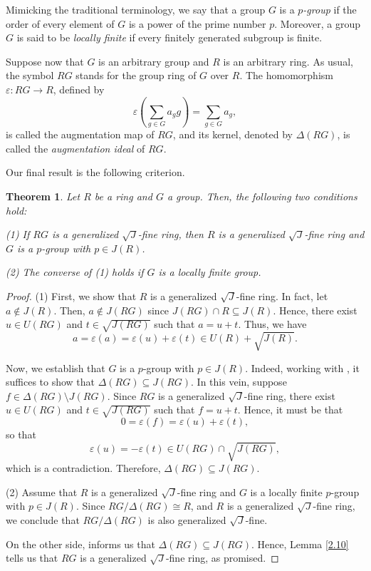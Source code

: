 \documentclass[12pt]{amsart}
\newtheorem{theorem}{Theorem}[section]
\theoremstyle{definition}
\begin{document}
Mimicking the traditional terminology, we say that a group \( G \) is a \textit{\( p \)-group} if the order of every element of \( G \) is a power of the prime number \( p \). Moreover, a group \( G \) is said to be \textit{locally finite} if every finitely generated subgroup is finite.

Suppose now that \( G \) is an arbitrary group and \( R \) is an arbitrary ring. As usual, the symbol \( RG \) stands for the group ring of \( G \) over \( R \). The homomorphism \( \varepsilon : RG \to R \), defined by
\[\varepsilon \left( \sum_{g \in G} a_g g \right) = \sum_{g \in G} a_g,\]
is called the augmentation map of \( RG \), and its kernel, denoted by \( \Delta(RG) \), is called the \textit{augmentation ideal} of \( RG \).

\medskip

Our final result is the following criterion.

\begin{theorem}\label{111}
Let \(R\) be a ring and \(G\) a group. Then, the following two conditions hold:

(1) If \(RG\) is a generalized \(\sqrt{J}\)-fine ring, then \(R\) is a generalized \(\sqrt{J}\)-fine ring and \(G\) is a \(p\)-group with \(p \in J(R)\).

(2) The converse of (1) holds if \(G\) is a locally finite group.
\end{theorem}

\begin{proof}
(1) First, we show that \(R\) is a generalized \(\sqrt{J}\)-fine ring. In fact, let \(a \not\in J(R)\). Then, \(a \not\in J(RG)\) since \(J(RG) \cap R \subseteq J(R)\). Hence, there exist \(u \in U(RG)\) and \(t \in \sqrt{J(RG)}\) such that \(a = u + t\). Thus, we have
\[
a = \varepsilon(a) = \varepsilon(u) + \varepsilon(t) \in U(R) + \sqrt{J(R)}.
\]

Now, we establish that \(G\) is a \(p\)-group with \(p \in J(R)\). Indeed, working with \cite[Proposition 15(i)]{con}, it suffices to show that \(\Delta(RG) \subseteq J(RG)\). In this vein, suppose \(f \in \Delta(RG) \setminus J(RG)\). Since \(RG\) is a generalized \(\sqrt{J}\)-fine ring, there exist \(u \in U(RG)\) and \(t \in \sqrt{J(RG)}\) such that \(f = u + t\). Hence, it must be that
\[
0 = \varepsilon(f) = \varepsilon(u) + \varepsilon(t),
\]
so that \[\varepsilon(u) = -\varepsilon(t) \in U(RG) \cap \sqrt{J(RG)},\] which is a contradiction. Therefore, \(\Delta(RG) \subseteq J(RG)\).

(2) Assume that \(R\) is a generalized \(\sqrt{J}\)-fine ring and \(G\) is a locally finite \(p\)-group with \(p \in J(R)\). Since \(RG/\Delta(RG) \cong R\), and \(R\) is a generalized \(\sqrt{J}\)-fine ring, we conclude that \(RG/\Delta(RG)\) is also generalized \(\sqrt{J}\)-fine. 

On the other side, \cite[Lemma 2]{zhou} informs us that \(\Delta(RG) \subseteq J(RG)\). Hence, Lemma \ref{2.10} tells us that \(RG\) is a generalized \(\sqrt{J}\)-fine ring, as promised.
\end{proof}
\end{document}
